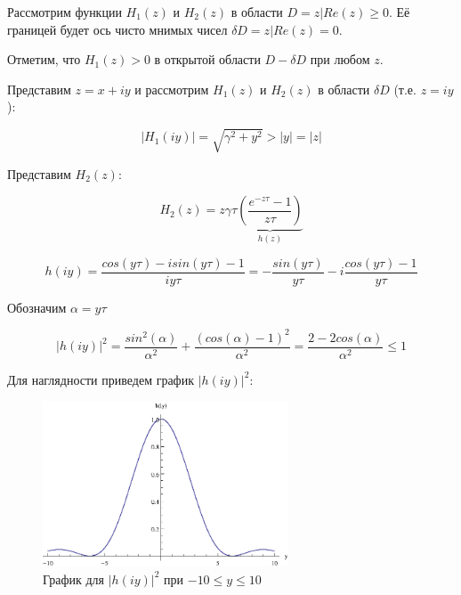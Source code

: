Рассмотрим функции $H_1(z)$ и $H_2(z)$ в области $D = {z|Re(z) \geq 0}$. Её границей будет ось чисто мнимых чисел $\delta D = {z|Re(z)=0}$.

Отметим, что $H_1(z)>0$ в открытой области $D-\delta D$ при любом $z$.

Представим $z=x+iy$ и рассмотрим $H_1(z)$ и $H_2(z)$ в области $\delta D$ (т.е. $z=iy$):

\begin{equation}\label{eq:h1}
|H_1(iy)| = \sqrt{\gamma^2 + y^2} > |y| = |z|
\end{equation}

Представим $H_2(z)$:

\begin{equation}
H_2(z) = z \gamma \tau \underbrace{\left(\dfrac{e^{-z \tau} - 1}{z \tau} \right)}_{h(z)}
\end{equation}

\begin{equation}
h(iy) = \dfrac{cos(y \tau) - i sin(y \tau) - 1}{iy \tau} = -\dfrac{sin(y \tau)}{y \tau} - i \dfrac{cos(y \tau)-1}{y \tau}
\end{equation}

Обозначим $\alpha = y \tau$

\begin{equation}
{|h(iy)|}^2 = \dfrac{sin^2(\alpha)}{\alpha^2} + \dfrac{(cos(\alpha)-1)^2}{\alpha^2} = \dfrac{2-2cos(\alpha)}{\alpha^2} \leq 1
\end{equation}

Для наглядности приведем график ${|h(iy)|}^2$:

\begin{figure}[h]
\begin{center}
\includegraphics[width=0.65\textwidth]{./2_analysis/proof.eps}
\end{center}
\caption{График для ${|h(iy)|}^2$ при $-10 \leq y \leq 10$}
\end{figure}


